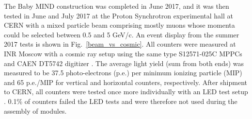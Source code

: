 

The Baby MIND construction was completed in June 2017, and it was then tested in June and July 2017 at the Proton Synchrotron experimental hall at CERN with a mixed particle beam comprising mostly muons whose momenta could be selected between 0.5 and 5 GeV/c. An event display from the summer 2017 tests is shown in Fig.~\ref{beam_vs_cosmic}.
All counters were measured at INR Moscow with a cosmic ray setup using the same type S12571-025C MPPCs and CAEN DT5742 digitizer \cite{Antonova:2017cdw}. The average light yield (sum from both ends) was measured to be 37.5 photo-electrons (p.e.) per minimum ionizing particle (MIP) and 65 p.e./MIP for vertical and horizontal counters, respectively. After shipment to CERN, all counters were tested once more individually with an LED test setup \cite{led_test_system}. 0.1\% of counters failed the LED tests and were therefore not used during the assembly of modules. 

